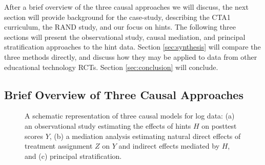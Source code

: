 \documentclass{article}\usepackage[]{graphicx}\usepackage[]{color}
\begin{document}
After a brief overview of the three causal approaches we will discuss,
the next section will provide background for the case-study,
describing the CTA1 curriculum, the RAND study, and our focus on
hints.
The following three sections will present the observational study,
causal mediation, and principal stratification approaches to the hint
data.
Section \ref{sec:synthesis} will compare the three methods directly,
and discuss how they may be applied to data from other educational
technology RCTs.
Section \ref{sec:conclusion} will conclude.

\subsection{Brief Overview of Three Causal Approaches}
\begin{figure}
\centering
{}
\caption{A schematic representation of three causal models for
  log data: (a) an observational study estimating the effects of hints
  $H$ on posttest scores $Y$, (b) a mediation analysis estimating
  natural direct effects of treatment assignment $Z$ on $Y$ and
  indirect effects mediated by $H$, and (c) principal stratification.}
\label{mediationFig}
\end{figure}
\end{document}
